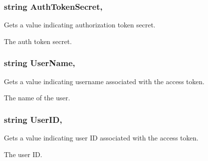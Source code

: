 \subsubsection[{Auth\+Token\+Secret}]{\setlength{\rightskip}{0pt plus 5cm}string Auth\+Token\+Secret\hspace{0.3cm}{\ttfamily [get]}, {}}\label{class_voxel_busters_1_1_native_plugins_1_1_twitter_session_a03e0793e8ed6eb3c164c61c0b6728a1f}


Gets a value indicating authorization token secret. 

The auth token secret.\hypertarget{class_voxel_busters_1_1_native_plugins_1_1_twitter_session_a6ec251e40abde6d9263485e1a237a82f}{}
\subsubsection[{User\+Name}]{\setlength{\rightskip}{0pt plus 5cm}string User\+Name\hspace{0.3cm}{\ttfamily [get]}, {}}\label{class_voxel_busters_1_1_native_plugins_1_1_twitter_session_a6ec251e40abde6d9263485e1a237a82f}


Gets a value indicating username associated with the access token. 

The name of the user.\hypertarget{class_voxel_busters_1_1_native_plugins_1_1_twitter_session_a385d641024c455dc9b5eb30c98c81ace}{}
\subsubsection[{User\+I\+D}]{\setlength{\rightskip}{0pt plus 5cm}string User\+I\+D\hspace{0.3cm}{\ttfamily [get]}, {}}\label{class_voxel_busters_1_1_native_plugins_1_1_twitter_session_a385d641024c455dc9b5eb30c98c81ace}


Gets a value indicating user I\+D associated with the access token. 

The user I\+D.
